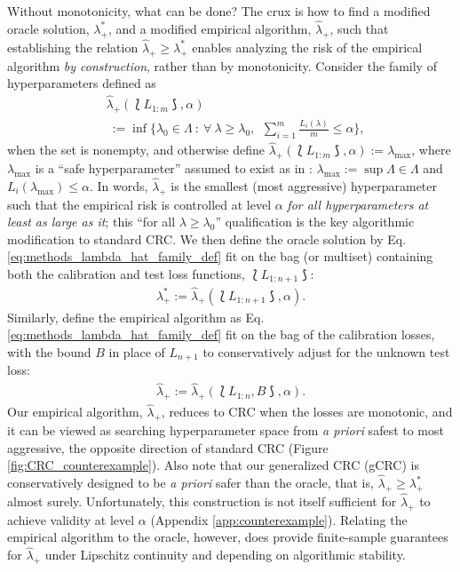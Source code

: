 Without monotonicity, what can be done? The crux is how to find a modified oracle solution, $\lambda^*_+$, and a modified empirical algorithm, $\hat\lambda_+$, such that establishing the relation $\hat\lambda_+\geq \lambda^*_+$ enables analyzing the risk of the empirical algorithm \textit{by construction}, rather than by monotonicity. Consider the family of hyperparameters defined as
\begin{align}\label{eq:methods_lambda_hat_family_def}
    &\widehat{\lambda}_+(\lbag L_{1:m}\rbag, \alpha) \\
    & \ := \inf \Big\{\lambda_0 \in \Lambda \ : \ \forall \ \lambda\geq \lambda_0,
    \ \ \sum_{i=1}^{m}\frac{L_i(\lambda)}{m} \leq \alpha \Big\}, \nonumber
\end{align}
when the set is nonempty, and otherwise define $\widehat{\lambda}_+(\lbag L_{1:m}\rbag, \alpha):=\lambda_{\max}$, where $\lambda_{\max}$ is a ``safe hyperparameter'' assumed to exist as in \citet{angelopoulos2022conformal}:  $\lambda_{\max}:=\sup\Lambda\in \Lambda$ and $L_i(\lambda_{\max})\leq \alpha$.
In words, $\widehat{\lambda}_+$ is the smallest (most aggressive) hyperparameter such that the empirical risk is controlled at level $\alpha$ \textit{for all hyperparameters at least as large as it}; this ``for all $\lambda\geq \lambda_0$'' qualification is the key algorithmic modification to standard CRC. 
We then define the oracle solution by Eq. \eqref{eq:methods_lambda_hat_family_def} fit on the bag (or multiset) containing both the calibration and test loss functions, $\lbag L_{1:n+1}\rbag$:
\begin{align}\label{eq:methods_lambda_oracle_def}
    \lambda_+^*:= \widehat{\lambda}_+(\lbag L_{1:n+1}\rbag, \alpha).
\end{align}
Similarly, define the empirical algorithm as Eq. \eqref{eq:methods_lambda_hat_family_def} fit on the bag of the calibration losses, with the bound $B$ in place of $L_{n+1}$ to conservatively adjust for the unknown test loss:
\begin{align}\label{eq:methods_lambda_empirical_def}
    \hat{\lambda}_+:= \widehat{\lambda}_+(\lbag L_{1:n}, B\rbag, \alpha).
\end{align}
Our empirical algorithm, $\hat{\lambda}_+$, reduces to CRC when the losses are monotonic, and it can be viewed as searching hyperparameter space from \textit{a priori} safest to most aggressive, the opposite direction of standard CRC (Figure \ref{fig:CRC_counterexample}). Also note that our generalized CRC (gCRC) is conservatively designed to be \textit{a priori} safer than the oracle, that is, $\hat\lambda_+\geq \lambda^*_+$ almost surely. Unfortunately, this construction is not itself sufficient for $\hat{\lambda}_+$ to achieve validity at level $\alpha$ (Appendix \ref{app:counterexample}). Relating the empirical algorithm to the oracle, however, does provide finite-sample guarantees for $\hat\lambda_+$ under Lipschitz continuity and depending on algorithmic stability. 



